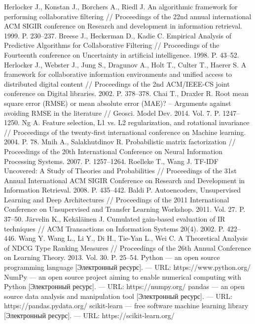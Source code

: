 \documentclass[a4paper,article,14pt]{extarticle}
\begin{document}
\begin{thebibliography}{1}
 Herlocker J., Konstan J., Borchers A., Riedl J. An algorithmic framework for performing collaborative filtering // Proceedings of the 22nd annual international ACM SIGIR conference on Research and development in information retrieval. 1999. P. 230--237.
 Breese J., Heckerman D., Kadie C. Empirical Analysis of Predictive Algorithms for Collaborative Filtering // Proceedings of the Fourteenth conference on Uncertainty in artificial intelligence. 1998. P. 43--52.
 Herlocker J., Webster J., Jung S., Dragunov A., Holt T., Culter T., Haerer S. A framework for collaborative information environments and unified access to distributed digital content // Proceedings of the 2nd ACM/IEEE-CS joint conference on Digital libraries. 2002. P. 378--378.
 Chai T., Draxler R. Root mean square error (RMSE) or mean absolute error (MAE)? – Arguments against avoiding RMSE in the literature // Geosci. Model Dev. 2014. Vol. 7. P. 1247--1250.
 Ng A. Feature selection, L1 vs. L2 regularization, and rotational invariance // Proceedings of the twenty-first international conference on Machine learning. 2004. P. 78.
 Mnih A., Salakhutdinov R. Probabilistic matrix factorization // Proceedings of the 20th International Conference on Neural Information Processing Systems. 2007. P. 1257--1264.
 Roelleke T., Wang J. TF-IDF Uncovered: A Study of Theories and Probabilities // Proceedings of the 31st Annual International ACM SIGIR Conference on Research and Development in Information Retrieval. 2008. P. 435--442.
 Baldi P. Autoencoders, Unsupervised Learning and Deep Architectures // Proceedings of the 2011 International Conference on Unsupervised and Transfer Learning Workshop. 2011. Vol. 27. P. 37--50.
 Järvelin K., Kekäläinen J.  Cumulated gain-based evaluation of IR techniques // ACM Transactions on Information Systems 20(4). 2002. P. 422--446.
 Wang Y. Wang L., Li Y., Di H., Tie-Yan L., Wei C.  A Theoretical Analysis of NDCG Type Ranking Measures // Proceedings of the 26th Annual Conference on Learning Theory. 2013. Vol. 30. P. 25--54.
 Python --- an open source programming language [Электронный ресурс]. — URL: https://www.python.org/
 NumPy --- an open source project aiming to enable numerical computing with Python [Электронный ресурс]. — URL: https://numpy.org/
 pandas --- an open source data analysis and manipulation tool [Электронный ресурс]. — URL: https://pandas.pydata.org/
 scikit-learn --- free software machine learning library [Электронный ресурс]. — URL: https://scikit-learn.org/

\end{thebibliography}
\end{document}
